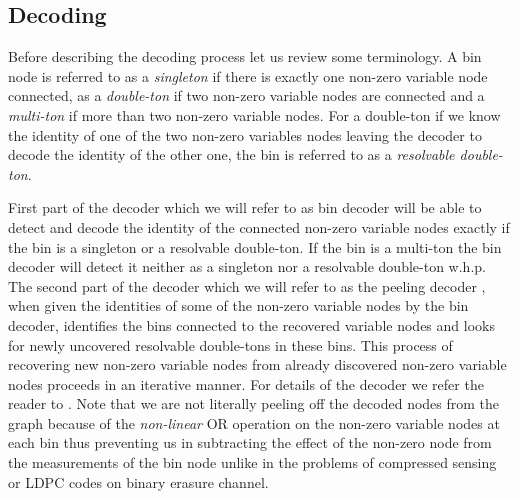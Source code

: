 \documentclass[conference,twocolumn]{IEEEtran}
\begin{document}
\subsection*{Decoding}
Before describing the decoding process let us review some terminology. A bin node is referred to as a \textit{singleton} if there is exactly one non-zero variable node connected, as a \textit{double-ton} if two non-zero variable nodes are connected and a \textit{multi-ton} if more than two non-zero variable nodes. For a double-ton if we know the identity of one of the two non-zero variables nodes leaving the decoder to decode the identity of the other one, the bin is referred to as a \textit{resolvable double-ton}.

First part of the decoder which we will refer to as bin decoder will be able to detect and decode the identity of the connected non-zero variable nodes exactly if the bin is a singleton or a resolvable double-ton. If the bin is a multi-ton the bin decoder will detect it neither as a singleton nor a resolvable double-ton w.h.p. The second part of the decoder which we will refer to as the peeling decoder \cite{li2015subisit}, when given the identities of some of the non-zero variable nodes by the bin decoder, identifies the bins connected to the recovered variable nodes and looks for newly uncovered resolvable double-tons in these bins. This process of recovering new non-zero variable nodes from already discovered non-zero variable nodes proceeds in an iterative manner. For details of the decoder we refer the reader to \cite{lee2015saffron}. Note that we are not literally peeling off the decoded nodes from the graph because of the \textit{non-linear} OR operation on the non-zero variable nodes at each bin thus preventing us in subtracting the effect of the non-zero node from the measurements of the bin node unlike in the problems of compressed sensing or LDPC codes on binary erasure channel.
\end{document}
